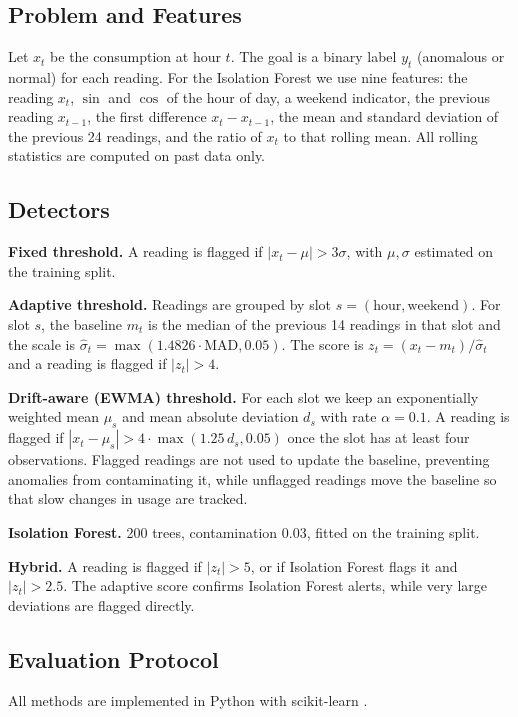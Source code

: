 \documentclass[conference]{IEEEtran}
\begin{document}
\subsection{Problem and Features}
Let $x_t$ be the consumption at hour $t$. The goal is a binary label $y_t$ (anomalous or normal) for each reading. For the Isolation Forest we use nine features: the reading $x_t$, $\sin$ and $\cos$ of the hour of day, a weekend indicator, the previous reading $x_{t-1}$, the first difference $x_t - x_{t-1}$, the mean and standard deviation of the previous 24 readings, and the ratio of $x_t$ to that rolling mean. All rolling statistics are computed on past data only.

\subsection{Detectors}
\textbf{Fixed threshold.} A reading is flagged if $|x_t-\mu|>3\sigma$, with $\mu,\sigma$ estimated on the training split.

\textbf{Adaptive threshold.} Readings are grouped by slot $s=(\text{hour},\text{weekend})$. For slot $s$, the baseline $m_t$ is the median of the previous 14 readings in that slot and the scale is $\hat\sigma_t=\max(1.4826\cdot\text{MAD},0.05)$. The score is $z_t=(x_t-m_t)/\hat\sigma_t$ and a reading is flagged if $|z_t|>4$.

\textbf{Drift-aware (EWMA) threshold.} For each slot we keep an exponentially weighted mean $\mu_s$ and mean absolute deviation $d_s$ with rate $\alpha=0.1$. A reading is flagged if $|x_t-\mu_s|>4\cdot\max(1.25\,d_s,0.05)$ once the slot has at least four observations. Flagged readings are not used to update the baseline, preventing anomalies from contaminating it, while unflagged readings move the baseline so that slow changes in usage are tracked.

\textbf{Isolation Forest.} 200 trees, contamination $0.03$, fitted on the training split.

\textbf{Hybrid.} A reading is flagged if $|z_t|>5$, or if Isolation Forest flags it and $|z_t|>2.5$. The adaptive score confirms Isolation Forest alerts, while very large deviations are flagged directly.

\subsection{Evaluation Protocol}
All methods are implemented in Python with scikit-learn \cite{pedregosa2011}.
\end{document}
